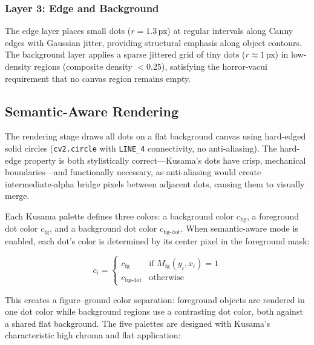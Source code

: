 \subsubsection{Layer 3: Edge and Background}

The edge layer places small dots ($r = 1.3$\,px) at regular intervals
along Canny edges \citep{canny1986computational} with Gaussian
jitter, providing structural emphasis along object contours. The
background layer applies a sparse jittered grid of tiny dots ($r \approx
1$\,px) in low-density regions (composite density $< 0.25$), satisfying
the horror-vacui requirement that no canvas region remains empty.

\subsection{Semantic-Aware Rendering}
\label{sec:method:rendering}

The rendering stage draws all dots on a flat background canvas using
hard-edged solid circles (\texttt{cv2.circle} with
\texttt{LINE\_4} connectivity, no anti-aliasing). The hard-edge
property is both stylistically correct---Kusama's dots have crisp,
mechanical boundaries---and functionally necessary, as anti-aliasing
would create intermediate-alpha bridge pixels between adjacent dots,
causing them to visually merge.

Each Kusama palette defines three colors: a background color
$c_{\text{bg}}$, a foreground dot color $c_{\text{fg}}$, and a
background dot color $c_{\text{bg-dot}}$. When semantic-aware mode is
enabled, each dot's color is determined by its center pixel in the
foreground mask:

\begin{equation}
    c_i = \begin{cases} c_{\text{fg}} & \text{if } M_{\text{fg}}(y_i, x_i) = 1 \\ c_{\text{bg-dot}} & \text{otherwise} \end{cases}
    \label{eq:semantic_color}
\end{equation}

This creates a figure--ground color separation: foreground objects
are rendered in one dot color while
background regions use a contrasting dot color,
both against a shared flat background. The five palettes are designed
with Kusama's characteristic high chroma and flat application:


